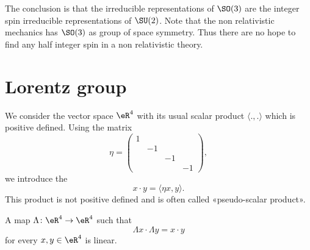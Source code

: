 \begin{normaltext}      \label{NORMooHWAYooPlSDOp}
    The conclusion is that the irreducible representations of $\SO(3)$ are the integer spin irreducible representations of $\SU(2)$. Note that the non relativistic mechanics has $\SO(3)$ as group of space symmetry. Thus there are no hope to find any half integer spin in a non relativistic theory.
\end{normaltext}

\section{Lorentz group}

\begin{definition}
    We consider the vector space \( \eR^4\) with its usual scalar product \( \langle ., .\rangle \) which is positive defined. Using the matrix
    \begin{equation}
        \eta=\begin{pmatrix}
             1   &       &       &       \\
                &   -1    &       &       \\
                &       &   -1    &       \\ 
                &       &       &   -1     
         \end{pmatrix},
    \end{equation}
    we introduce the 
    \begin{equation}    \label{EQooQAXNooXhGUQV}
        x\cdot y=\langle \eta x, y\rangle .
    \end{equation}
    This product is not positive defined and is often called «pseudo-scalar product».
\end{definition}

\begin{lemma}       \label{LEMooICEYooNcjJjD}
    A map \( \Lambda\colon \eR^4\to \eR^4\) such that
    \begin{equation}
        \Lambda x\cdot \Lambda y=x\cdot y
    \end{equation}
    for every \( x,y\in  \eR^4\) is linear.
\end{lemma}

